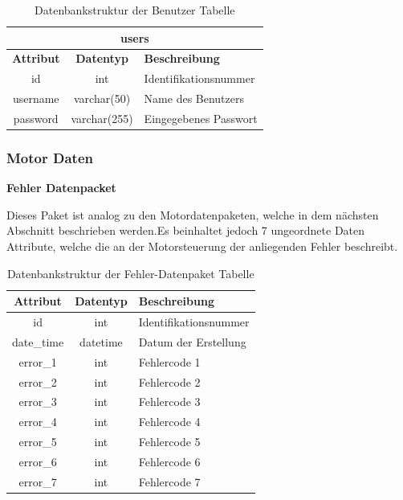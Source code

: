 \begin{table}[H]
	\begin{center}
		\begin{tabular}{|c|c|l|}
		\hline
		\multicolumn{3}{|c|}{\textbf{users}}                          \\ \hline
		\textbf{Attribut} & \textbf{Datentyp} & \textbf{Beschreibung} \\ \hline
		id                & int               & Identifikationsnummer \\ \hline
		username          & varchar(50)       & Name des Benutzers    \\ \hline
		password          & varchar(255)      & Eingegebenes Passwort \\ \hline
		\end{tabular}
		\caption{Datenbankstruktur der Benutzer Tabelle}
		\label{tab:logindata}
	\end{center}
\end{table}

\subsubsection{Motor Daten} \label{sec:motor_data}

\textbf{Fehler Datenpacket}

Dieses Paket ist analog zu den Motordatenpaketen, welche in dem nächsten Abschnitt beschrieben werden.Es beinhaltet jedoch 7 ungeordnete Daten Attribute, welche die an der Motorsteuerung der anliegenden Fehler beschreibt.

\begin{table}[H]
	\begin{center}
		\begin{tabular}{|c|c|l|}
			\hline
			\textbf{Attribut}           & \textbf{Datentyp} & \textbf{Beschreibung}                     \\ \hline
			id                          & int               & Identifikationsnummer                     \\ \hline
			date\_time                	& datetime          & Datum der Erstellung        				\\ \hline
			error\_1                 	& int	            & Fehlercode 1                      		\\ \hline
			error\_2            		& int               & Fehlercode 2            					\\ \hline
			error\_3        			& int               & Fehlercode 3       						\\ \hline
			error\_4           			& int               & Fehlercode 4       	 					\\ \hline
			error\_5    				& int               & Fehlercode 5 								\\ \hline
			error\_6					& int               & Fehlercode 6        						\\ \hline
			error\_7					& int               & Fehlercode 7    							\\ \hline
		\end{tabular}
		\caption{Datenbankstruktur der Fehler-Datenpaket Tabelle}
		\label{tab:data4}
	\end{center}
\end{table}


